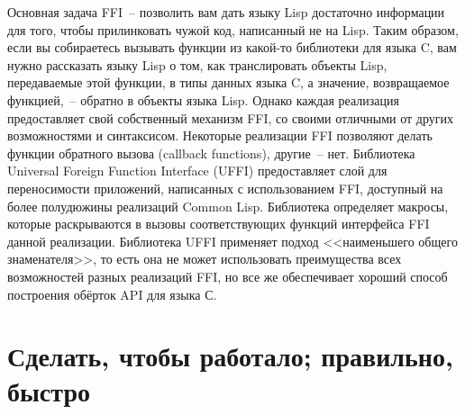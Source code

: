 Основная задача FFI~-- позволить вам дать языку Lisp достаточно информации для того, чтобы
прилинковать чужой код, написанный не на Lisp. Таким образом, если вы собираетесь вызывать
функции из какой-то библиотеки для языка C, вам нужно рассказать языку Lisp о том, как
транслировать объекты Lisp, передаваемые этой функции, в типы данных языка C, а значение,
возвращаемое функцией,~-- обратно в объекты языка Lisp. Однако каждая реализация
предоставляет свой собственный механизм FFI, со своими отличными от других возможностями и
синтаксисом. Некоторые реализации FFI позволяют делать функции обратного вызова (callback
functions), другие~-- нет. Библиотека Universal Foreign Function Interface (UFFI)
предоставляет слой для переносимости приложений, написанных с использованием FFI,
доступный на более полудюжины реализаций Common Lisp. Библиотека определяет макросы,
которые раскрываются в вызовы соответствующих функций интерфейса FFI данной
реализации. Библиотека UFFI применяет подход <<наименьшего общего знаменателя>>, то есть
она не может использовать преимущества всех возможностей разных реализаций FFI, но все же
обеспечивает хороший способ построения обёрток API для языка С.

\section{Сделать, чтобы работало; правильно, быстро}

